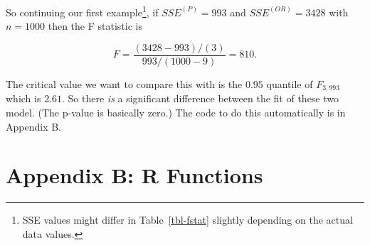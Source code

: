 \documentclass[
  letterpaper,
  DIV=11,
  numbers=noendperiod]{scrartcl}
\begin{document}
So continuing our first example\footnote{SSE values might differ in
  Table~\ref{tbl-fstat} slightly depending on the actual data values.},
if \(SSE^{(P)} = 993\) and \(SSE^{(OR)} = 3428\) with \(n = 1000\) then
the F statistic is

\[F = \frac{(3428 - 993) / (3)}{993 / (1000 - 9)} = 810.\]

The critical value we want to compare this with is the \(0.95\) quantile
of \(F_{3, 993}\) which is \(2.61\). So there \emph{is} a significant
difference between the fit of these two model. (The p-value is basically
zero.) The code to do this automatically is in Appendix B.

\newpage{}

\hypertarget{appendix-b-r-functions}{%
\section{Appendix B: R Functions}\label{appendix-b-r-functions}}
\end{document}
